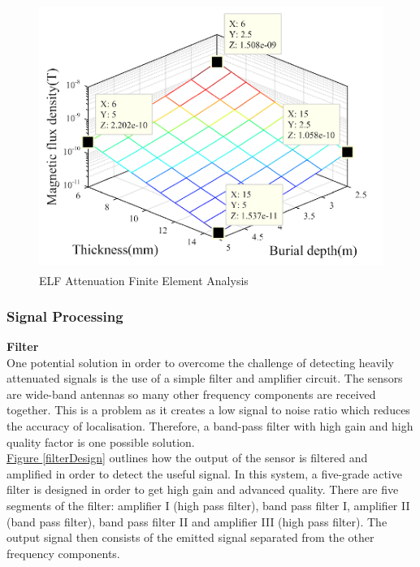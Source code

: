 \documentclass[11pt]{article}		%
\newlength{\imageheight}	 %
\newcommand{\supercite}[1]{\textsuperscript{\cite{#1}}}		%
\newcommand{\figref}[1]{\hyperref[#1]{Figure \ref*{#1}}}    %
\begin{document}
		    \begin{figure}[h]
				\centering
				\includegraphics[height = \imageheight]{Attenuation}
				\caption{ELF Attenuation Finite Element Analysis \supercite{FDT}}
				\label{ELFAttenuation}
			\end{figure}
	
			\subsubsection{Signal Processing}

			\textbf{Filter} \\
	        One potential solution in order to overcome the challenge of detecting heavily attenuated signals is the use of a simple filter and amplifier circuit.
	        The sensors are wide-band antennas so many other frequency components are received together. This is a problem as it creates a low signal to noise ratio which reduces the accuracy of localisation.
	        Therefore, a band-pass filter with high gain and high quality factor is one possible solution.
	        \\
	        \hspace*{3ex}\figref{filterDesign} outlines how the output of the sensor is filtered and amplified in order to detect the useful signal. 
	        In this system, a five-grade active filter is designed in order to get high gain and advanced quality. There are five segments of the filter: amplifier I (high pass filter), band pass filter I, amplifier II (band pass filter), band pass filter II and amplifier III (high pass filter).
	        The output signal then consists of the emitted signal separated from the other frequency components. 
	        
\end{document}

